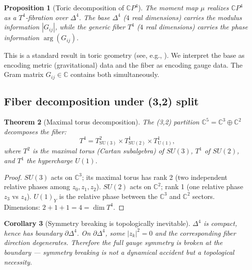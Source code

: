 \documentclass[12pt,a4paper]{article}
\newtheorem{theorem}{Theorem}[section]
\newtheorem{proposition}[theorem]{Proposition}
\newtheorem{corollary}[theorem]{Corollary}
\newcommand{\CP}{\mathbb{C}P}
\newcommand{\CC}{\mathbb{C}}
\begin{document}
\begin{proposition}[Toric decomposition of $\CP^4$]
\label{prop:shadow}
The moment map $\mu$ realizes $\CP^4$ as a $T^4$-fibration
over $\Delta^4$.  The base $\Delta^4$ ($4$ real dimensions)
carries the modulus information $|G_{ij}|$, while the generic
fiber $T^4$ ($4$ real dimensions) carries the phase information
$\arg(G_{ij})$.
\end{proposition}

This is a standard result in toric geometry
(see, e.g., \cite{fulton1993}).  We interpret
the base as encoding metric (gravitational) data and the fiber
as encoding gauge data.  The Gram matrix $G_{ij} \in \CC$
contains both simultaneously.

\subsection{Fiber decomposition under (3,2) split}

\begin{theorem}[Maximal torus decomposition]
\label{thm:torus}
The (3,2) partition $\CC^5 = \CC^3 \oplus \CC^2$ decomposes the
fiber:
\begin{equation}
T^4 = T^2_{\mathrm{SU(3)}} \times T^1_{\mathrm{SU(2)}}
\times T^1_{\mathrm{U(1)}},
\end{equation}
where $T^2$ is the maximal torus (Cartan subalgebra) of $SU(3)$,
$T^1$ of $SU(2)$, and $T^1$ the hypercharge $U(1)$.
\end{theorem}

\begin{proof}
$SU(3)$ acts on $\CC^3$; its maximal torus has rank 2 (two
independent relative phases among $z_0,z_1,z_2$).
$SU(2)$ acts on $\CC^2$; rank 1 (one relative phase $z_3$ vs $z_4$).
$U(1)_Y$ is the relative phase between the $\CC^3$ and $\CC^2$
sectors.  Dimensions: $2 + 1 + 1 = 4 = \dim T^4$.
\end{proof}

\begin{corollary}[Symmetry breaking is topologically inevitable]
\label{cor:breaking}
$\Delta^4$ is compact, hence has boundary $\partial\Delta^4$.
On $\partial\Delta^4$, some $|z_k|^2 = 0$ and the corresponding
fiber direction degenerates.  Therefore the full gauge symmetry
is broken at the boundary --- symmetry breaking is not a
dynamical accident but a topological necessity.
\end{corollary}

\end{document}
